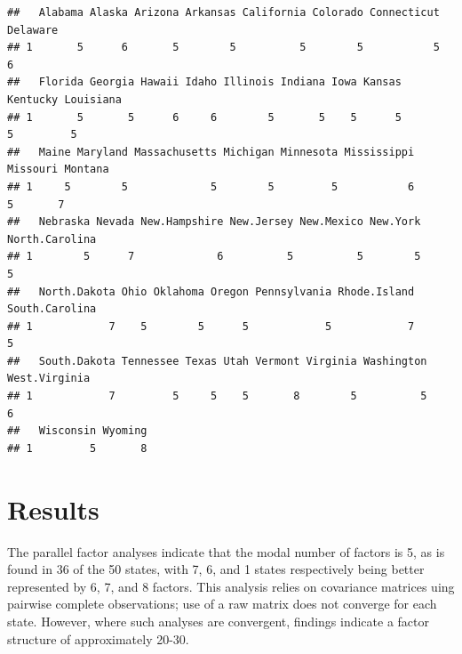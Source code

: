 \documentclass[
  english,
  man]{apa6}
\begin{document}
\begin{verbatim}
##   Alabama Alaska Arizona Arkansas California Colorado Connecticut Delaware
## 1       5      6       5        5          5        5           5        6
##   Florida Georgia Hawaii Idaho Illinois Indiana Iowa Kansas Kentucky Louisiana
## 1       5       5      6     6        5       5    5      5        5         5
##   Maine Maryland Massachusetts Michigan Minnesota Mississippi Missouri Montana
## 1     5        5             5        5         5           6        5       7
##   Nebraska Nevada New.Hampshire New.Jersey New.Mexico New.York North.Carolina
## 1        5      7             6          5          5        5              5
##   North.Dakota Ohio Oklahoma Oregon Pennsylvania Rhode.Island South.Carolina
## 1            7    5        5      5            5            7              5
##   South.Dakota Tennessee Texas Utah Vermont Virginia Washington West.Virginia
## 1            7         5     5    5       8        5          5             6
##   Wisconsin Wyoming
## 1         5       8
\end{verbatim}

\hypertarget{results}{%
\section{Results}\label{results}}

The parallel factor analyses indicate that the modal number of factors is 5, as is found in 36 of the 50 states, with 7, 6, and 1 states respectively being better represented by 6, 7, and 8 factors. This analysis relies on covariance matrices uing pairwise complete observations; use of a raw matrix does not converge for each state. However, where such analyses are convergent, findings indicate a factor structure of approximately 20-30.
\end{document}
